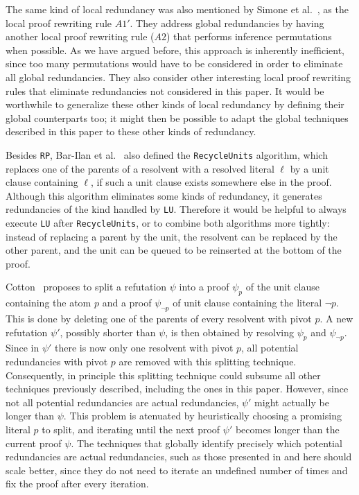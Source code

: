\documentclass[envcountsame]{llncs}
\newcommand{\RP}{\texttt{\upshape RP}}
\newcommand{\LU}{\texttt{\upshape LU}}
\begin{document}
The same kind of local redundancy was also mentioned by Simone et al.~\cite{SimoneBrutomessoSarygina2010An-Efficient-and-Flexible-Approach-to-Resolution-Proof-Reduction}, 
as the local proof rewriting rule $A1'$. They address global redundancies by having another local proof 
rewriting rule ($A2$) that performs inference permutations when possible. 
As we have argued before, this approach is inherently inefficient, since too many permutations would have to be considered in order to eliminate all global redundancies. 
They also consider other interesting local proof rewriting rules that eliminate redundancies not considered in this paper. It would be worthwhile to generalize these other kinds of local redundancy by defining 
their global counterparts too; it might then be possible to adapt the global techniques described in this paper 
to these other kinds of redundancy.

Besides {\RP}, Bar-Ilan et al.~\cite{Bar-IlanFuhrmannHooryShachamStrichman2009Linear-time-reductions-of-resolution-proofs} also defined the \texttt{RecycleUnits} algorithm, which replaces one of the parents of a resolvent with a resolved literal $\ell$ by a unit clause containing $\ell$, if such a unit clause exists somewhere else in the proof. Although this algorithm eliminates some kinds of redundancy, it generates redundancies of the kind handled by {\LU}. Therefore it would be helpful to always execute {\LU} after \texttt{RecycleUnits}, or to combine both algorithms more tightly: instead of replacing a parent by the unit, the resolvent can be replaced by the other parent, and the unit can be queued to be reinserted at the bottom of the proof.

Cotton~\cite{Cotton2010Two-Techniques-for-Minimizing-Resolution-Proofs} proposes
to split a refutation $\psi$ into a proof $\psi_{p}$ of the unit clause containing the atom $p$ and a proof $\psi_{\neg p}$ of unit clause containing the literal $\neg p$. This is done by deleting one of the parents of every resolvent with pivot $p$. A new refutation $\psi'$, possibly shorter than $\psi$, is then obtained by resolving $\psi_{p}$ and $\psi_{\neg p}$. Since in $\psi'$ there is now only one resolvent with pivot $p$, all potential redundancies with pivot $p$ are removed with this splitting technique. Consequently, in principle this splitting technique could subsume all other techniques previously described, including the ones in this paper. However, since not all potential redundancies are actual redundancies, $\psi'$ might actually be longer than $\psi$. This problem is atenuated by heuristically choosing a promising literal $p$ to split, and iterating until the next proof $\psi'$ becomes longer than the current proof $\psi$. The techniques that globally identify precisely which potential redundancies are actual redundancies, such as those presented in \cite{Bar-IlanFuhrmannHooryShachamStrichman2009Linear-time-reductions-of-resolution-proofs} and here should scale better, since they do not need to iterate an undefined number of times and fix the proof after every iteration.
\end{document}
